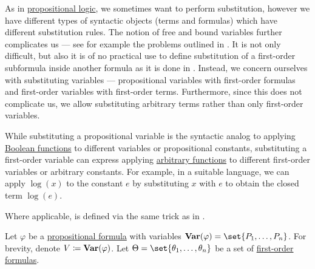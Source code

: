 \begin{definition}\label{def:first_order_substitution}
  As in \hyperref[subsec:propositional_logic]{propositional logic}, we sometimes want to perform substitution, however we have different types of syntactic objects (terms and formulas) which have different substitution rules. The notion of free and bound variables further complicates us --- see for example the problems outlined in . It is not only difficult, but also it is of no practical use to define substitution of a first-order subformula inside another formula as it is done in . Instead, we concern ourselves with substituting variables --- propositional variables with first-order formulas and first-order variables with first-order terms. Furthermore, since this does not complicate us, we allow substituting arbitrary terms rather than only first-order variables.

  While substituting a propositional variable is the syntactic analog to applying \hyperref[def:boolean_function]{Boolean functions} to different variables or propositional constants, substituting a first-order variable can express applying \hyperref[def:function]{arbitrary functions} to different first-order variables or arbitrary constants. For example, in a suitable language, we can apply \( \log(x) \) to the constant \( e \) by substituting \( x \) with \( e \) to obtain the closed term \( \log(e) \).

  Where applicable,  is defined via the same trick as in .

  \begin{thmenum}
     Let \( \varphi \) be a \hyperref[def:propositional_syntax/formula]{propositional formula} with variables \( \op*{Var}(\varphi) = \set{ P_1, \ldots, P_n } \). For brevity, denote \( V \coloneqq \op*{Var}(\varphi) \). Let \( \Theta = \set{ \theta_1, \ldots, \theta_n } \) be a set of \hyperref[def:first_order_syntax/formula]{first-order formulas}.


\end{thmenum}
\end{definition}
